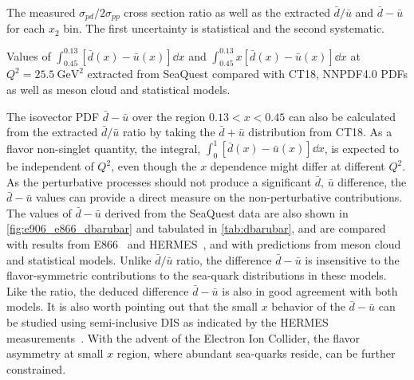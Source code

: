 \documentclass[reprint,aps,unsortedaddress,superscriptaddress,prl,floatfix,showpacs,linenumbers,final]{revtex4-2}
\begin{document}
\begin{table}[htbp!]
	\centering
	\caption{The measured $\sigma_{pd}/2\sigma_{pp}$ cross section ratio as well
		as the extracted $\bar{d}/\bar{u}$ and $\bar{d}-\bar{u}$ for each $x_{2}$ bin.
		The first uncertainty is statistical and the second systematic.}
	\label{tab:dbarubar}
	\begin{adjustbox}{max width=\textwidth}
		
	\end{adjustbox}
\end{table}
\begin{table}[htbp!]
	\centering
	\caption{Values of $\int_{0.45}^{0.13} \left[\bar{d}\left(x\right) - \bar{u}\left(x\right)\right] \dd{x}$
		and $\int_{0.45}^{0.13} x\left[\bar{d}\left(x\right) - \bar{u}\left(x\right)\right] \dd{x}$ at $Q^2=\SI{25.5}{\GeV\squared}$ extracted from
		SeaQuest compared with CT18, NNPDF4.0 PDFs as well as meson cloud and statistical models.}
	\label{tab:dbarMubar}
	\begin{adjustbox}{max width=\textwidth}
		
	\end{adjustbox}
\end{table}

The isovector PDF $\bar{d}-\bar{u}$ over the region $0.13<x<0.45$
can also be calculated from the extracted $\bar{d}/\bar{u}$ ratio by taking the $\bar{d}+\bar{u}$
distribution from CT18.
As a flavor non-singlet quantity, the integral, $\int^1_0 \left[\bar{d}\left(x\right) - \bar{u}\left(x\right)\right] \dd{x}$,
is expected to be independent of $Q^2$, even though the $x$ dependence might differ at different $Q^2$.
As the perturbative processes should not produce a significant $\bar{d},\,\bar{u}$ difference,
the $\bar{d}-\bar{u}$ values can provide a direct measure on the non-perturbative contributions.
The values of $\bar{d}-\bar{u}$ derived from the SeaQuest data are also shown in \cref{fig:e906_e866_dbarubar} and tabulated in \cref{tab:dbarubar},
and are compared with results from E866~\cite{towell2001} and HERMES~\cite{ackerstaff1998},
and with predictions from meson cloud and statistical models.
Unlike $\bar{d}/\bar{u}$ ratio, the difference $\bar{d}-\bar{u}$ is insensitive to the flavor-symmetric contributions
to the sea-quark distributions in these models. Like the ratio, the deduced difference $\bar{d}-\bar{u}$ is also
in good agreement with both models.
It is also worth pointing out that the small $x$ behavior of the $\bar{d}-\bar{u}$ can be studied using
semi-inclusive DIS as indicated by the HERMES measurements~\cite{ackerstaff1998}.
With the advent of the Electron Ion Collider, the flavor asymmetry at small $x$ region, where abundant sea-quarks reside,
can be further constrained.
\end{document}
